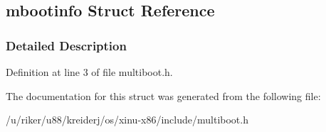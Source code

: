 \hypertarget{structmbootinfo}{}\subsection{mbootinfo Struct Reference}
\label{structmbootinfo}


\subsubsection{Detailed Description}


Definition at line 3 of file multiboot.\+h.



The documentation for this struct was generated from the following file\+:\begin{DoxyCompactItemize}
\item 
/u/riker/u88/kreiderj/os/xinu-\/x86/include/multiboot.\+h\end{DoxyCompactItemize}
